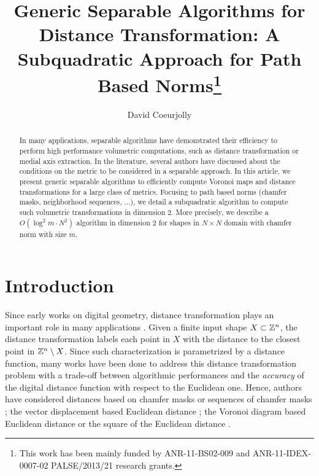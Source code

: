 \documentclass{llncs}
\title{Generic Separable Algorithms for Distance Transformation: A
  Subquadratic Approach for Path Based Norms\thanks{This work has been
    mainly funded by ANR-11-BS02-009 and ANR-11-IDEX-0007-02
    PALSE/2013/21 research grants.}}
\author{David Coeurjolly}
\institute{ CNRS,  LIRIS, UMR5205, F-69621, France\\
}
\begin{document}
\maketitle


\begin{abstract}\sloppy
In many applications, separable algorithms have demonstrated their
efficiency to perform high performance volumetric computations, such
as distance transformation or medial axis extraction. In the
literature, several authors have discussed about the conditions on the
metric to be considered in a separable approach.  In this article, we
present generic separable algorithms to efficiently compute Voronoi
maps and distance transformations for a large class of
metrics. Focusing to path based norms (chamfer masks, neighborhood
sequences, ...), we detail a subquadratic algorithm to compute such
volumetric transformations in dimension 2. More precisely, we describe
a $O(\log^2{m}\cdot N^2)$ algorithm in dimension 2 for shapes in
$N\times N$ domain with chamfer norm with size $m$.

\end{abstract}

\section{Introduction}
\label{sec:introduction}

Since early works on digital geometry, distance transformation plays
an important role in many applications
\cite{Rosenfeld1966,Rosenfeld1968}. Given a finite input shape
$X\subset {\mathbb{Z}}^n$, the distance transformation labels each point in $X$
with the distance to the closest point in ${\mathbb{Z}}^n \setminus X$. Since
such characterization is parametrized by a distance function, many
works have been done to address this distance transformation problem
with a trade-off between algorithmic performances and the
\emph{accuracy} of the digital distance function with respect to the
Euclidean one.  Hence, authors have considered distances based on
chamfer masks
\cite{Rosenfeld1968,borgefors,Thiel_IWCIA7,fouard:ivc:2005} or
sequences of chamfer masks
\cite{ROSEN_66,mukherjee,Nagy05,Strand2008,DBLP:conf/dgci/NormandSE13};
the vector displacement based Euclidean distance
\cite{danielson,ragnemalm,MULL_92,Cuisenaire1999_268}; the Voronoi
diagram based Euclidean distance
\cite{BreuEtAl95,maurer_pami} or the square of the
Euclidean distance \cite{SaitTori:94,Hirata,roerdnik}.
\end{document}
